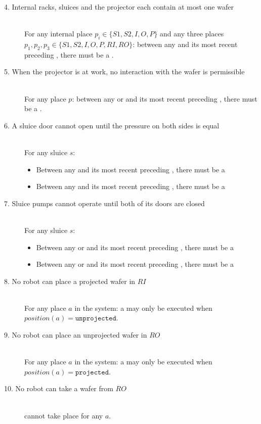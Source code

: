\begin{description}
 
\item[4. Internal racks, sluices and the projector each contain at most one wafer] \hfill \\
For any internal place $p_i \in \{S1, S2, I, O, P\}$ and any three places $p_1, p_2, p_3 \in \{S1, S2, I, O, P, RI, RO\}$: between any  and its most recent preceding , there must be a . 
 
\item[5. When the projector is at work, no interaction with the wafer is permissible] \hfill \\
For any place $p$: between any  or  and its most recent preceding , there must be a . 
 
 \item[6. A sluice door cannot open until the pressure on both sides is equal] \hfill \\
 For any sluice $s$:
 \begin{itemize}
  \item Between any  and its most recent preceding , there must be a 
  \item Between any  and its most recent preceding , there must be a 
 \end{itemize}

 \item[7. Sluice pumps cannot operate until both of its doors are closed] \hfill \\
 For any sluice $s$:
 \begin{itemize}
  \item Between any  or  and its most recent preceding , there must be a 
  \item Between any  or  and its most recent preceding , there must be a 
 \end{itemize}

\item[8. No robot can place a projected wafer in $RI$] \hfill \\
For any place $a$ in the system: a  may only be executed when $position(a) = \texttt{unprojected}$.

\item[9. No robot can place an unprojected wafer in $RO$] \hfill \\
For any place $a$ in the system: a  may only be executed when $position(a) = \texttt{projected}$.

\item[10. No robot can take a wafer from $RO$] \hfill \\
 cannot take place for any $a$.
 
\end{description}
